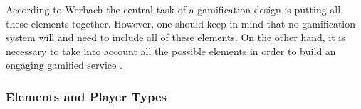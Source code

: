 According to Werbach the central task of a gamification design is putting all these elements together. However, one should keep in mind that no gamification system will and need to include all of these elements. On the other hand, it is necessary to take into account all the possible elements in order to build an engaging gamified service \cite{werbach2012win}. 




\subsubsection{Elements and Player Types}

